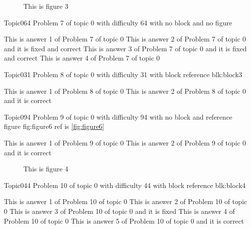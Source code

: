 \documentclass[master]{exam}
\begin{document}
\begin{figure}
	\begin{center}
		This is figure 3 
		\label{fig:figure3}
	\end{center}
\end{figure}

\begin{problem}{Topic0}{64}
	Problem 7 of topic 0 with difficulty 64 with no block and no figure
	\begin{answers}
		\answer This is answer 1 of Problem 7 of topic 0 
		 This is answer 2 of Problem 7 of topic 0 and it is fixed and correct
		 This is answer 3 of Problem 7 of topic 0 and it is fixed and correct
		\answer This is answer 4 of Problem 7 of topic 0 
	\end{answers}
\end{problem}

\begin{problem}[requires=blk:block3]{Topic0}{31}
	Problem 8 of topic 0 with difficulty 31 with block reference blk:block3
	\begin{answers}
		\answer This is answer 1 of Problem 8 of topic 0 
		\answer[correct] This is answer 2 of Problem 8 of topic 0 and it is correct
	\end{answers}
\end{problem}

\begin{problem}{Topic0}{94}
	Problem 9 of topic 0 with difficulty 94 with no block and reference figure fig:figure6 ref is \ref{fig:figure6}
	\begin{answers}
		\answer This is answer 1 of Problem 9 of topic 0 
		\answer[correct] This is answer 2 of Problem 9 of topic 0 and it is correct
	\end{answers}
\end{problem}



\begin{figure}
	\begin{center}
		This is figure 4 
		\label{fig:figure4}
	\end{center}
\end{figure}

\begin{problem}[requires=blk:block4]{Topic0}{44}
	Problem 10 of topic 0 with difficulty 44 with block reference blk:block4
	\begin{answers}
		\answer This is answer 1 of Problem 10 of topic 0 
		\answer This is answer 2 of Problem 10 of topic 0 
		\answer[fixed] This is answer 3 of Problem 10 of topic 0 and it is fixed
		\answer This is answer 4 of Problem 10 of topic 0 
		\answer[correct] This is answer 5 of Problem 10 of topic 0 and it is correct
	\end{answers}
\end{problem}
\end{document}
